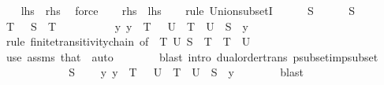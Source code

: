 \begin{isabellebody}
%
\isadelimproof
%
\endisadelimproof
%
\isatagproof
{}\isamarkupfalse%
\isanewline
\ \ \isamarkupfalse%
\ {\isachardoublequoteopen}{\isacharquery}lhs\ {\isasymsubseteq}\ {\isacharquery}rhs{\isachardoublequoteclose}\ \isamarkupfalse%
\ force\isanewline
\ \ \isamarkupfalse%
\ {\isachardoublequoteopen}{\isacharquery}rhs\ {\isasymsubseteq}\ {\isacharquery}lhs{\isachardoublequoteclose}\isanewline
\ \ \isamarkupfalse%
\ {\isacharparenleft}rule\ Union{\isacharunderscore}subsetI{\isacharparenright}\isanewline
\ \ \ \ \isamarkupfalse%
\ S\isanewline
\ \ \ \ \isamarkupfalse%
\ {\isachardoublequoteopen}S\ {\isasymin}\ {\isasymF}{\isachardoublequoteclose}\isanewline
\ \ \ \ \isamarkupfalse%
\ {\isachardoublequoteopen}{\isacharbraceleft}T\ {\isasymin}\ {\isasymF}{\isachardot}\ S\ {\isasymsubseteq}\ T{\isacharbraceright}\ {\isacharequal}\ {\isacharbraceleft}{\isacharbraceright}{\isachardoublequoteclose}\isanewline
\ \ \ \ \ \ \ {\isachardoublequoteopen}{\isasymnot}\ {\isacharparenleft}{\isasymexists}y{\isachardot}\ y\ {\isasymin}\ {\isacharbraceleft}T\ {\isasymin}\ {\isasymF}{\isachardot}\ {\isasymforall}U{\isasymin}{\isasymF}{\isachardot}\ {\isasymnot}\ T\ {\isasymsubset}\ U{\isacharbraceright}\ {\isasymand}\ S\ {\isasymsubseteq}\ y{\isacharparenright}{\isachardoublequoteclose}\isanewline
\ \ \ \ \ \ \isamarkupfalse%
\ {\isacharparenleft}rule\ finite{\isacharunderscore}transitivity{\isacharunderscore}chain\ {\isacharbrackleft}of\ {\isacharunderscore}\ {\isachardoublequoteopen}{\isasymlambda}T\ U{\isachardot}\ S\ {\isasymsubseteq}\ T\ {\isasymand}\ T\ {\isasymsubset}\ U{\isachardoublequoteclose}{\isacharbrackright}{\isacharparenright}\isanewline
\ \ \ \ \ \ \ \ \ \isamarkupfalse%
\ {\isacharparenleft}use\ assms\ that\ \ auto{\isacharparenright}\isanewline
\ \ \ \ \ \ \isamarkupfalse%
\ {\isacharparenleft}blast\ intro{\isacharcolon}\ dual{\isacharunderscore}order{\isachardot}trans\ psubset{\isacharunderscore}imp{\isacharunderscore}subset{\isacharparenright}\isanewline
\ \ \ \ \ \ \isamarkupfalse%
\isanewline
\ \ \ \ \isamarkupfalse%
\ {\isacartoucheopen}S\ {\isasymin}\ {\isasymF}{\isacartoucheclose}\ \isamarkupfalse%
\ {\isachardoublequoteopen}{\isasymexists}y{\isachardot}\ y\ {\isasymin}\ {\isacharbraceleft}T\ {\isasymin}\ {\isasymF}{\isachardot}\ {\isasymforall}U{\isasymin}{\isasymF}{\isachardot}\ {\isasymnot}\ T\ {\isasymsubset}\ U{\isacharbraceright}\ {\isasymand}\ S\ {\isasymsubseteq}\ y{\isachardoublequoteclose}\isanewline
\ \ \ \ \ \ \isamarkupfalse%
\ blast\isanewline
\ \ \isamarkupfalse%
\isanewline
{}\isamarkupfalse%
%
\endisatagproof
{\isafoldproof}%
%
\isadelimproof
\isanewline
%
\endisadelimproof
%
\isadelimtheory
\isanewline
%
\endisadelimtheory
%
\isatagtheory
{}\isamarkupfalse%
%
\endisatagtheory
{\isafoldtheory}%
%
\isadelimtheory
%
\endisadelimtheory
%
\end{isabellebody}%
